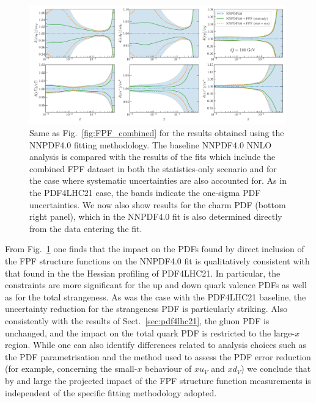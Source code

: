 \begin{figure}[t]
\centering
\includegraphics[width=0.99\textwidth]{plots/NNPDF40-FPFall-q100gev.pdf}
\caption{
  Same as Fig.~\ref{fig:FPF_combined} for the results obtained
  using the NNPDF4.0 fitting methodology.
  The baseline NNPDF4.0 NNLO analysis is compared
  with the results of the fits which include the combined FPF dataset
  in both the statistics-only scenario and for the case
  where systematic uncertainties are also accounted for.
  As in the PDF4LHC21 case, the bands indicate the one-sigma PDF uncertainties.
  We now also show results for the charm PDF (bottom right panel), which
  in the NNPDF4.0 fit is also determined directly from the data entering the fit.
%
}
\label{fig:NNPDF40_baseline}
\end{figure}

From  Fig.~\ref{fig:NNPDF40_baseline} one finds that
the impact on the PDFs found by direct inclusion of the FPF structure
functions on the NNPDF4.0 fit is qualitatively consistent with
that found in the the Hessian profiling of PDF4LHC21.
%
In particular, the constraints are more significant for the up and down
quark valence PDFs as well as for the total strangeness.
%
As was the case with the PDF4LHC21 baseline, the uncertainty reduction
for the strangeness PDF is particularly
striking.
%
Also consistently with the results of Sect.~\ref{sec:pdf4lhc21}, the gluon
PDF is unchanged, and the impact on the total quark PDF
is restricted to the large-$x$ region.
%
While one can also identify differences related to analysis choices
such as the PDF parametrisation and the method used to assess the PDF
error reduction (for example, concerning the small-$x$ behaviour of $xu_V$ and $xd_V$)
we conclude that by and large the projected impact of the FPF structure function
measurements is independent of the specific fitting methodology adopted.

